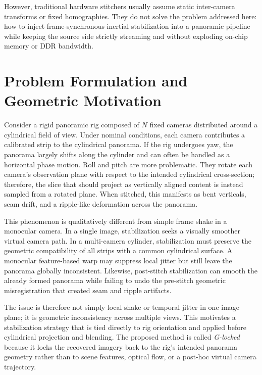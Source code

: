 \documentclass[journal]{IEEEtran}
\begin{document}
However, traditional hardware stitchers usually assume static inter-camera transforms or fixed homographies. They do not solve the problem addressed here: how to inject frame-synchronous inertial stabilization into a panoramic pipeline while keeping the source side strictly streaming and without exploding on-chip memory or DDR bandwidth.

\section{Problem Formulation and Geometric Motivation}
\label{sec:problem}
Consider a rigid panoramic rig composed of $N$ fixed cameras distributed around a cylindrical field of view. Under nominal conditions, each camera contributes a calibrated strip to the cylindrical panorama. If the rig undergoes yaw, the panorama largely shifts along the cylinder and can often be handled as a horizontal phase motion. Roll and pitch are more problematic. They rotate each camera's observation plane with respect to the intended cylindrical cross-section; therefore, the slice that should project as vertically aligned content is instead sampled from a rotated plane. When stitched, this manifests as bent verticals, seam drift, and a ripple-like deformation across the panorama.

This phenomenon is qualitatively different from simple frame shake in a monocular camera. In a single image, stabilization seeks a visually smoother virtual camera path. In a multi-camera cylinder, stabilization must preserve the geometric compatibility of all strips with a common cylindrical surface. A monocular feature-based warp may suppress local jitter but still leave the panorama globally inconsistent. Likewise, post-stitch stabilization can smooth the already formed panorama while failing to undo the pre-stitch geometric misregistration that created seam and ripple artifacts.

The issue is therefore not simply local shake or temporal jitter in one image plane; it is geometric inconsistency across multiple views. This motivates a stabilization strategy that is tied directly to rig orientation and applied before cylindrical projection and blending. The proposed method is called \emph{G-locked} because it locks the recovered imagery back to the rig's intended panorama geometry rather than to scene features, optical flow, or a post-hoc virtual camera trajectory.
\end{document}
